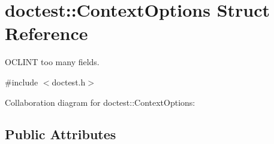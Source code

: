 \hypertarget{structdoctest_1_1ContextOptions}{}\section{doctest\+:\+:Context\+Options Struct Reference}
\label{structdoctest_1_1ContextOptions}


O\+C\+L\+I\+NT too many fields.  




{\ttfamily \#include $<$doctest.\+h$>$}



Collaboration diagram for doctest\+:\+:Context\+Options\+:
\subsection*{Public Attributes}
